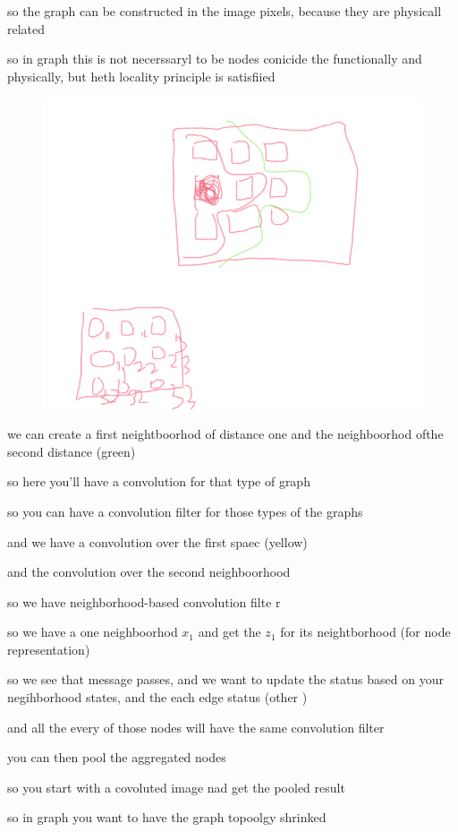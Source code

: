 \documentclass{article}
\begin{document}
so the graph can be constructed in the image pixels, because they are physicall related 


so in graph this is not necerssaryl  to be nodes conicide the functionally and physically, but heth locality principle is satisfiied

\begin{figure}
	\centering
	\includegraphics[width=0.7\linewidth]{"../imgs/neighborhood filtering"}
	\caption[Filtering in the cnn]{}
	\label{fig:neighborhood-filtering}
\end{figure}


we can create a first neightboorhod of distance one and the neighboorhod ofthe second distance (green)

so here you'll have a convolution for that type of graph


so you can have a convolution filter for those types of the graphs

and we have a convolution over the first spaec (yellow)

and the convolution over the second neighboorhood

so we have neighborhood-based convolution filte r


so we have a one neighboorhod $x_1$ and get the $z_1$ for its neightborhood (for node representation)

so we see that message passes, and we want to update the status based on your negihborhood states, and the each edge status (other )

and all the every of those nodes will have the same  convolution filter

you can then pool the aggregated nodes

so you start with a covoluted image nad get the pooled result

so in graph you want to have the graph topoolgy shrinked
\end{document}
